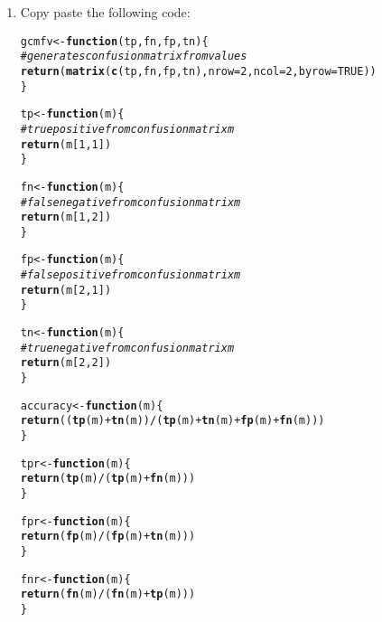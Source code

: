 \documentclass[../../dsa1101_notes.Rtex]{subfiles}\usepackage[]{graphicx}\usepackage[]{color}
\makeatletter
\newcommand{\hlnum}[1]{\textcolor[rgb]{0.686,0.059,0.569}{#1}}%
\newcommand{\hlcom}[1]{\textcolor[rgb]{0.678,0.584,0.686}{\textit{#1}}}%
\newcommand{\hlopt}[1]{\textcolor[rgb]{0,0,0}{#1}}%
\newcommand{\hlstd}[1]{\textcolor[rgb]{0.345,0.345,0.345}{#1}}%
\newcommand{\hlkwa}[1]{\textcolor[rgb]{0.161,0.373,0.58}{\textbf{#1}}}%
\newcommand{\hlkwb}[1]{\textcolor[rgb]{0.69,0.353,0.396}{#1}}%
\newcommand{\hlkwc}[1]{\textcolor[rgb]{0.333,0.667,0.333}{#1}}%
\newcommand{\hlkwd}[1]{\textcolor[rgb]{0.737,0.353,0.396}{\textbf{#1}}}%
\newenvironment{kframe}{%
 \def\at@end@of@kframe{}%
 \ifinner\ifhmode%
  \def\at@end@of@kframe{\end{minipage}}%
  \begin{minipage}{\columnwidth}%
 \fi\fi%
 \def\FrameCommand##1{\hskip\@totalleftmargin \hskip-\fboxsep
 \colorbox{shadecolor}{##1}\hskip-\fboxsep
     \hskip-\linewidth \hskip-\@totalleftmargin \hskip\columnwidth}%
 \MakeFramed {\advance\hsize-\width
   \@totalleftmargin\z@ \linewidth\hsize
   \@setminipage}}%
 {\par\unskip\endMakeFramed%
 \at@end@of@kframe}
\newenvironment{knitrout}{}{} %
\makeatother
\begin{document}
\begin{enumerate}
  \item Copy paste the following code:
\begin{knitrout}
\color{fgcolor}\begin{kframe}
\begin{alltt}
\hlstd{gcmfv} \hlkwb{<-} \hlkwa{function}\hlstd{(}\hlkwc{tp}\hlstd{,} \hlkwc{fn}\hlstd{,} \hlkwc{fp}\hlstd{,} \hlkwc{tn}\hlstd{) \{}
  \hlcom{# generates confusion matrix from values}
  \hlkwd{return} \hlstd{(}\hlkwd{matrix}\hlstd{(}\hlkwd{c}\hlstd{(tp, fn, fp, tn),} \hlkwc{nrow} \hlstd{=} \hlnum{2}\hlstd{,} \hlkwc{ncol} \hlstd{=} \hlnum{2}\hlstd{,} \hlkwc{byrow} \hlstd{=} \hlnum{TRUE}\hlstd{))}
\hlstd{\}}

\hlstd{tp} \hlkwb{<-} \hlkwa{function}\hlstd{(}\hlkwc{m}\hlstd{) \{}
  \hlcom{# true positive from confusion matrix m}
  \hlkwd{return} \hlstd{(m[}\hlnum{1}\hlstd{,} \hlnum{1}\hlstd{])}
\hlstd{\}}

\hlstd{fn} \hlkwb{<-} \hlkwa{function}\hlstd{(}\hlkwc{m}\hlstd{) \{}
  \hlcom{# false negative from confusion matrix m}
  \hlkwd{return} \hlstd{(m[}\hlnum{1}\hlstd{,} \hlnum{2}\hlstd{])}
\hlstd{\}}

\hlstd{fp} \hlkwb{<-} \hlkwa{function}\hlstd{(}\hlkwc{m}\hlstd{) \{}
  \hlcom{# false positive from confusion matrix m}
  \hlkwd{return} \hlstd{(m[}\hlnum{2}\hlstd{,} \hlnum{1}\hlstd{])}
\hlstd{\}}

\hlstd{tn} \hlkwb{<-} \hlkwa{function}\hlstd{(}\hlkwc{m}\hlstd{) \{}
  \hlcom{# true negative from confusion matrix m}
  \hlkwd{return} \hlstd{(m[}\hlnum{2}\hlstd{,} \hlnum{2}\hlstd{])}
\hlstd{\}}

\hlstd{accuracy} \hlkwb{<-} \hlkwa{function}\hlstd{(}\hlkwc{m}\hlstd{) \{}
  \hlkwd{return} \hlstd{((}\hlkwd{tp}\hlstd{(m)}\hlopt{+}\hlkwd{tn}\hlstd{(m))}\hlopt{/}\hlstd{(}\hlkwd{tp}\hlstd{(m)}\hlopt{+}\hlkwd{tn}\hlstd{(m)}\hlopt{+}\hlkwd{fp}\hlstd{(m)}\hlopt{+}\hlkwd{fn}\hlstd{(m)))}
\hlstd{\}}

\hlstd{tpr} \hlkwb{<-} \hlkwa{function}\hlstd{(}\hlkwc{m}\hlstd{) \{}
  \hlkwd{return} \hlstd{(}\hlkwd{tp}\hlstd{(m)}\hlopt{/}\hlstd{(}\hlkwd{tp}\hlstd{(m)}\hlopt{+}\hlkwd{fn}\hlstd{(m)))}
\hlstd{\}}

\hlstd{fpr} \hlkwb{<-} \hlkwa{function}\hlstd{(}\hlkwc{m}\hlstd{) \{}
  \hlkwd{return} \hlstd{(}\hlkwd{fp}\hlstd{(m)}\hlopt{/}\hlstd{(}\hlkwd{fp}\hlstd{(m)}\hlopt{+}\hlkwd{tn}\hlstd{(m)))}
\hlstd{\}}

\hlstd{fnr} \hlkwb{<-} \hlkwa{function}\hlstd{(}\hlkwc{m}\hlstd{) \{}
  \hlkwd{return} \hlstd{(}\hlkwd{fn}\hlstd{(m)}\hlopt{/}\hlstd{(}\hlkwd{fn}\hlstd{(m)}\hlopt{+}\hlkwd{tp}\hlstd{(m)))}
\hlstd{\}}


\end{alltt}
\end{kframe}
\end{knitrout}
\end{enumerate}
\end{document}
